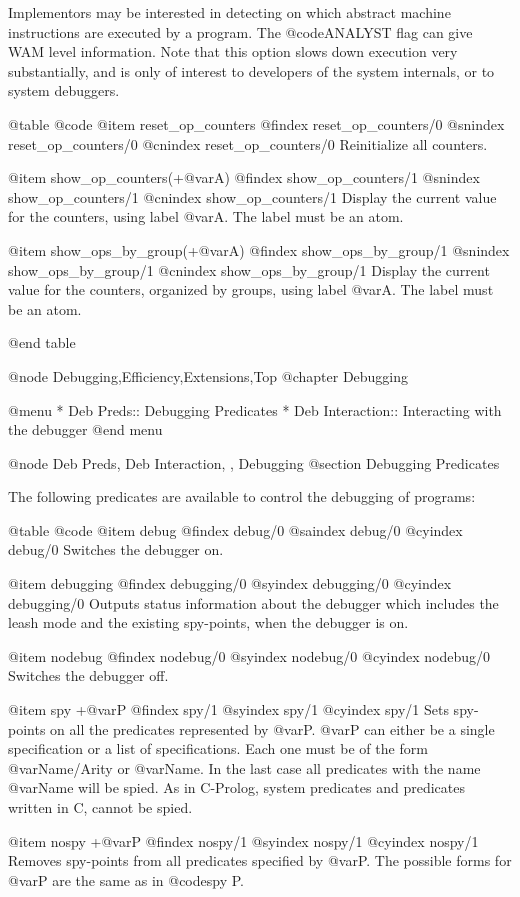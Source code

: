 {{{{{{{{{Implementors may be interested in detecting on which abstract machine
instructions are executed by a program. The @code{ANALYST} flag can give
WAM level information. Note that this option slows down execution very
substantially, and is only of interest to developers of the system
internals, or to system debuggers.

@table @code
@item reset_op_counters
@findex reset_op_counters/0
@snindex reset_op_counters/0
@cnindex reset_op_counters/0
Reinitialize all counters.

@item show_op_counters(+@var{A})
@findex show_op_counters/1
@snindex show_op_counters/1
@cnindex show_op_counters/1
Display the current value for the counters, using label @var{A}. The
label must be an atom.

@item show_ops_by_group(+@var{A})
@findex show_ops_by_group/1
@snindex show_ops_by_group/1
@cnindex show_ops_by_group/1
Display the current value for the counters, organized by groups, using
label @var{A}. The label must be an atom.

@end table

@node Debugging,Efficiency,Extensions,Top 
@chapter Debugging

@menu
* Deb Preds:: Debugging Predicates
* Deb Interaction:: Interacting with the debugger
@end menu

@node Deb Preds, Deb Interaction, , Debugging
@section Debugging Predicates

The following predicates are available to control the debugging of
programs:

@table @code
@item debug
@findex debug/0
@saindex debug/0
@cyindex debug/0
Switches the debugger on.

@item debugging
@findex debugging/0
@syindex debugging/0
@cyindex debugging/0
Outputs status information about the debugger which includes the leash
mode and the existing spy-points, when the debugger is on.

@item nodebug
@findex nodebug/0
@syindex nodebug/0
@cyindex nodebug/0
Switches the debugger off.

@item spy +@var{P}
@findex spy/1
@syindex spy/1
@cyindex spy/1
 Sets spy-points on all the predicates represented by
@var{P}. @var{P} can either be a single specification or a list of 
specifications. Each one must be of the form @var{Name/Arity} 
or @var{Name}. In the last case all predicates with the name 
@var{Name} will be spied. As in C-Prolog, system predicates and 
predicates written in C, cannot be spied.

@item nospy +@var{P}
@findex nospy/1
@syindex nospy/1
@cyindex nospy/1
 Removes spy-points from all predicates specified by @var{P}.
The possible forms for @var{P} are the same as in @code{spy P}.

}}}}}}}}}
